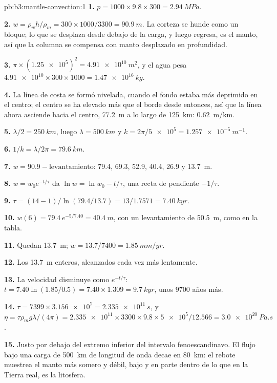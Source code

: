 \begin{solution}{pb:b3:mantle-convection:1}
\textbf{1.} $p = 1000\times9.8\times300 = \qty{2.94}{MPa}$.

\textbf{2.} $w = \rho_wh/\rho_m = 300\times1000/3300 = \qty{90.9}{m}$. La corteza
se hunde como un bloque; lo que se desplaza desde debajo de la carga, y luego regresa, es el
manto, así que la columna se compensa con manto desplazado en profundidad.

\textbf{3.} $\pi\times(\num{1.25e5})^2 = \qty{4.91e10}{m^2}$, y el agua
pesa $\num{4.91e10}\times300\times1000 = \qty{1.47e16}{kg}$.

\textbf{4.} La línea de costa se formó nivelada, cuando el fondo estaba más deprimido
en el centro; el centro se ha elevado más que el borde desde entonces, así que la línea
ahora asciende hacia el centro, \qty{77.2}{m} a lo largo de \qty{125}{km}:
\qty{0.62}{m/km}.

\textbf{5.} $\lambda/2 = \qty{250}{km}$, luego $\lambda = \qty{500}{km}$ y $k =
2\pi/\num{5e5} = \qty{1.257e-5}{m^{-1}}$.

\textbf{6.} $1/k = \lambda/2\pi = \qty{79.6}{km}$.

\textbf{7.} $w = 90.9 - \text{levantamiento}$: 79.4, 69.3, 52.9, 40.4, 26.9 y
\qty{13.7}{m}.

\textbf{8.} $w = w_0e^{-t/\tau}$ da $\ln w = \ln w_0 - t/\tau$, una recta
de pendiente $-1/\tau$.

\textbf{9.} $\tau = (14 - 1)/\ln(79.4/13.7) = 13/1.7571 = \qty{7.40}{kyr}$.

\textbf{10.} $w(6) = 79.4\,e^{-5/7.40} = \qty{40.4}{m}$, con un levantamiento de
\qty{50.5}{m}, como en la tabla.

\textbf{11.} Quedan \qty{13.7}{m}; $\dot w = 13.7/7400 = \qty{1.85}{mm/yr}$.

\textbf{12.} Los \qty{13.7}{m} enteros, alcanzados cada vez más lentamente.

\textbf{13.} La velocidad disminuye como $e^{-t/\tau}$: $t = 7.40\ln(1.85/0.5) =
7.40\times1.309 = \qty{9.7}{kyr}$, unos 9700 años más.

\textbf{14.} $\tau = 7399\times\num{3.156e7} = \qty{2.335e11}{s}$, y $\eta =
\tau\rho_mg\lambda/(4\pi) = \num{2.335e11}\times3300\times9.8\times\num{5e5}/
12.566 = \qty{3.0e20}{Pa.s}$.

\textbf{15.} Justo por debajo del extremo inferior del intervalo fenoescandinavo. El flujo
bajo una carga de \qty{500}{km} de longitud de onda decae en \qty{80}{km}: el
rebote muestrea el manto más somero y débil, bajo y en parte dentro de lo que
en la Tierra real, es la litosfera.


\end{solution}
